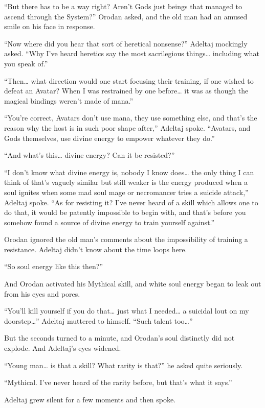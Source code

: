 \documentclass[a4paper,10pt]{book}
\begin{document}
“But there has to be a way right? Aren’t Gods just beings that managed to ascend through the System?” Orodan asked, and the old man had an amused smile on his face in response.\par
“Now where did you hear that sort of heretical nonsense?” Adeltaj mockingly asked. “Why I’ve heard heretics say the most sacrilegious things… including what you speak of.”\par
“Then… what direction would one start focusing their training, if one wished to defeat an Avatar? When I was restrained by one before… it was as though the magical bindings weren’t made of mana.”\par
“You’re correct, Avatars don’t use mana, they use something else, and that’s the reason why the host is in such poor shape after,” Adeltaj spoke. “Avatars, and Gods themselves, use divine energy to empower whatever they do.”\par
“And what’s this… divine energy? Can it be resisted?”\par
“I don’t know what divine energy is, nobody I know does… the only thing I can think of that’s vaguely similar but still weaker is the energy produced when a soul ignites when some mad soul mage or necromancer tries a suicide attack,” Adeltaj spoke. “As for resisting it? I’ve never heard of a skill which allows one to do that, it would be patently impossible to begin with, and that’s before you somehow found a source of divine energy to train yourself against.”\par
Orodan ignored the old man’s comments about the impossibility of training a resistance. Adeltaj didn’t know about the time loops here.\par
“So soul energy like this then?”\par
And Orodan activated his Mythical skill, and white soul energy began to leak out from his eyes and pores.\par
“You’ll kill yourself if you do that… just what I needed… a suicidal lout on my doorstep…” Adeltaj muttered to himself. “Such talent too…”\par
But the seconds turned to a minute, and Orodan’s soul distinctly did not explode. And Adeltaj’s eyes widened.\par
“Young man… is that a skill? What rarity is that?” he asked quite seriously.\par
“Mythical. I’ve never heard of the rarity before, but that’s what it says.”\par
Adeltaj grew silent for a few moments and then spoke.\par
\end{document}

